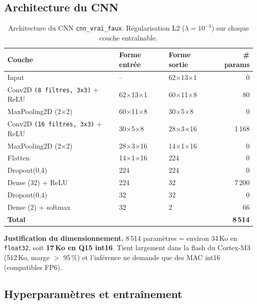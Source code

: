 \subsection{Architecture du CNN}

\begin{table}[H]
\centering
\small
\begin{tabularx}{0.85\linewidth}{@{}l l l r@{}}
\toprule
\textbf{Couche} & \textbf{Forme entrée} & \textbf{Forme sortie} & \textbf{\# params} \\
\midrule
Input              & --             & 62$\times$13$\times$1     & 0 \\
Conv2D \verb|(8 filtres, 3x3)| + ReLU  & 62$\times$13$\times$1 & 60$\times$11$\times$8 & 80 \\
MaxPooling2D (2$\times$2)            & 60$\times$11$\times$8 & 30$\times$5$\times$8  & 0 \\
Conv2D \verb|(16 filtres, 3x3)| + ReLU & 30$\times$5$\times$8 & 28$\times$3$\times$16 & 1\,168 \\
MaxPooling2D (2$\times$2)            & 28$\times$3$\times$16 & 14$\times$1$\times$16 & 0 \\
Flatten            & 14$\times$1$\times$16  & 224                       & 0 \\
Dropout(0{,}4)     & 224            & 224                       & 0 \\
Dense (32) + ReLU  & 224            & 32                        & 7\,200 \\
Dropout(0{,}4)     & 32             & 32                        & 0 \\
Dense (2) + softmax & 32            & 2                         & 66 \\
\midrule
\textbf{Total}     & & & \textbf{8\,514} \\
\bottomrule
\end{tabularx}
\caption{Architecture du CNN \texttt{cnn\_vrai\_faux}. Régularisation L2 ($\lambda = 10^{-3}$) sur chaque couche entraînable.}
\label{tab:fp5-architecture}
\end{table}

\textbf{Justification du dimensionnement.} 8\,514 paramètres = environ 34\,Ko en \texttt{float32}, soit \textbf{17\,Ko en Q15 int16}. Tient largement dans la flash du Cortex-M3 (512\,Ko, marge $>$ 95\,\%) et l'inférence ne demande que des MAC int16 (compatibles FP6).

\subsection{Hyperparamètres et entraînement}

